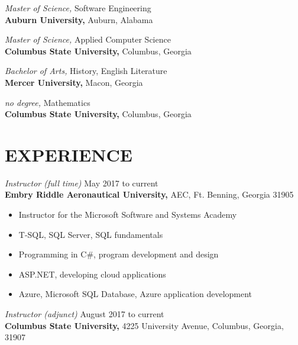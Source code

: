 \documentclass[margin, 10pt]{res} %
\begin{document}
\begin{resume}
{\it Master of Science,} Software Engineering\\
\textbf{Auburn University,} Auburn, Alabama

{\it Master of Science,} Applied Computer Science\\
\textbf{Columbus State University,} Columbus, Georgia

{\it Bachelor of Arts,} History, English Literature\\
\textbf{Mercer University,} Macon, Georgia

{\it no degree,} Mathematics\\
\textbf{Columbus State University,} Columbus, Georgia

 
\section{EXPERIENCE}
 
%

{\it Instructor (full time)} \hfill May 2017 to current \\
\textbf{Embry Riddle Aeronautical University,} AEC, Ft. Benning, Georgia 31905

\begin{itemize} \itemsep -2pt %
\item Instructor for the Microsoft Software and Systems Academy
\item T-SQL, SQL Server, SQL fundamentals
\item Programming in C\#, program development and design
\item ASP.NET, developing cloud applications
\item Azure, Microsoft SQL Database, Azure application development
\end{itemize}
 
{\it Instructor (adjunct)} \hfill August 2017 to current \\
\textbf{Columbus State University,} 4225 University Avenue, Columbus, Georgia, 31907


\end{resume}
\end{document}
